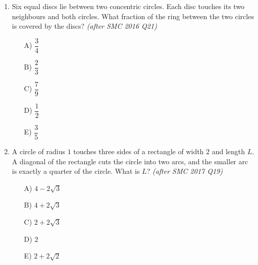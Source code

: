 \documentclass[11pt,a4paper]{article}
\begin{document}
\begin{enumerate}
\item \begin{minipage}[t]{0.60\linewidth}
Six equal discs lie between two concentric circles. Each disc touches its two neighbours and both circles. What fraction of the ring between the two circles is covered by the discs? \textit{\small(after SMC 2016 Q21)}
\begin{itemize}[itemsep=3pt]
\item[A)] $\dfrac34$
\item[B)] $\dfrac23$
\item[C)] $\dfrac79$
\item[D)] $\dfrac12$
\item[E)] $\dfrac35$
\end{itemize}
\end{minipage}\hfill
\begin{minipage}[t]{0.36\linewidth}
\vspace{0pt}
\centering
{}
\end{minipage}

\item \begin{minipage}[t]{0.60\linewidth}
A circle of radius $1$ touches three sides of a rectangle of width $2$ and length $L$. A diagonal of the rectangle cuts the circle into two arcs, and the smaller arc is exactly a quarter of the circle. What is $L$? \textit{\small(after SMC 2017 Q19)}
\begin{itemize}
\item[A)] $4-2\sqrt3$
\item[B)] $4+2\sqrt3$
\item[C)] $2+2\sqrt3$
\item[D)] $2$
\item[E)] $2+2\sqrt2$
\end{itemize}
\end{minipage}\hfill
\begin{minipage}[t]{0.36\linewidth}
\vspace{0pt}
\centering
{}
\end{minipage}


\end{enumerate}
\end{document}
